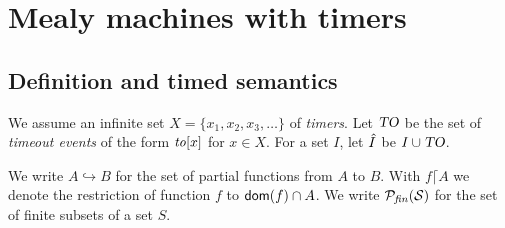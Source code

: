 \section{Mealy machines with timers}

\subsection{Definition and timed semantics}
We assume an infinite set $X = \{ x_1, x_2, x_3,\ldots \}$ of {\em timers}.
Let $\mbox{\sl TO}$ be the set of {\em timeout events} of the form
$\mathit{to}[x]$ for $x \in X$.
For a set $I$, let $\hat{I}$ be $I \cup \mbox{\sl TO}$.

We write $A \hookrightarrow B$ for the set of partial functions from $A$ to $B$.
With $f \lceil A$ we denote the restriction of function $f$ to ${\textsf{dom}}(f) \cap A$.
We write $\cal{P}_{\mathit{fin}}(S)$ for the set of finite subsets of a set $S$.

